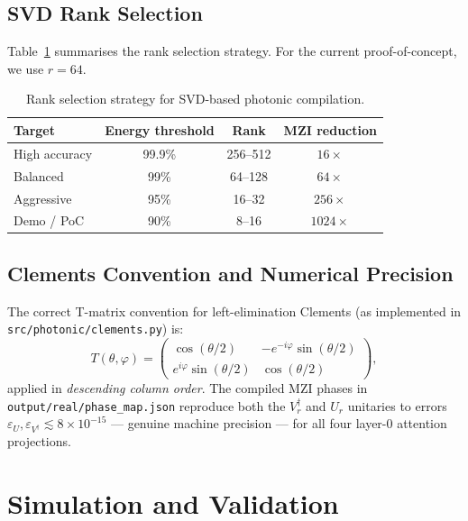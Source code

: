 \documentclass[12pt, a4paper]{article}
\begin{document}
\subsection{SVD Rank Selection}

Table~\ref{tab:rank_selection} summarises the rank selection strategy.
For the current proof-of-concept, we use $r = 64$.

\begin{table}[h]
\centering
\caption{Rank selection strategy for SVD-based photonic compilation.}
\label{tab:rank_selection}
\begin{tabular}{lccc}
\toprule
\textbf{Target} & \textbf{Energy threshold} & \textbf{Rank} & \textbf{MZI reduction} \\
\midrule
High accuracy      & 99.9\% & 256--512 & $16\times$ \\
Balanced           & 99\%   & 64--128  & $64\times$ \\
Aggressive         & 95\%   & 16--32   & $256\times$ \\
Demo / PoC         & 90\%   & 8--16    & $1024\times$ \\
\bottomrule
\end{tabular}
\end{table}

\subsection{Clements Convention and Numerical Precision}

The correct T-matrix convention for left-elimination Clements (as implemented
in \texttt{src/photonic/clements.py}) is:
\begin{equation}
  T(\theta, \varphi) =
  \begin{pmatrix}
    \cos(\theta/2) & -e^{-i\varphi}\sin(\theta/2) \\
    e^{i\varphi}\sin(\theta/2) & \cos(\theta/2)
  \end{pmatrix},
  \label{eq:T_correct}
\end{equation}
applied in \emph{descending column order}.
The compiled MZI phases in \texttt{output/real/phase\_map.json} reproduce both
the $V_r^\dagger$ and $U_r$ unitaries to errors $\varepsilon_U, \varepsilon_{V^\dagger}
\lesssim 8 \times 10^{-15}$ --- genuine machine precision --- for all four
layer-0 attention projections.

\section{Simulation and Validation}
\label{sec:simulation}
\end{document}
